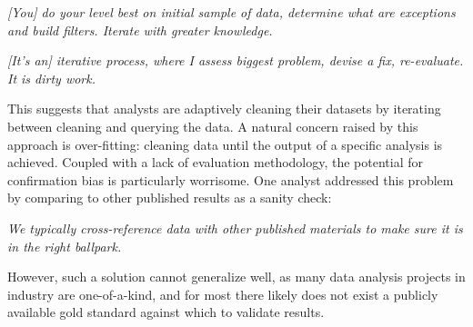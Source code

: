 \vspace{0.5em}
\emph{[You] do your level best on initial sample of data, determine what are exceptions and build filters. Iterate with greater knowledge.}

\vspace{0.7em}
\emph{[It's an] iterative process, where I assess biggest problem, devise a fix, re-evaluate. It is dirty work.}

\vspace{0.5em}

This suggests that analysts are adaptively cleaning their datasets by iterating between cleaning and querying the data.
A natural concern raised by this approach is over-fitting: cleaning data until the output of a specific analysis is achieved.
Coupled with a lack of evaluation methodology, the potential for confirmation bias is particularly worrisome.
One analyst addressed this problem by comparing to other published results as a sanity check:

\vspace{0.5em}
\emph{We typically cross-reference data with other published materials to make sure it is in the right ballpark.}
\vspace{0.5em}

However, such a solution cannot generalize well, as many data analysis projects in industry are one-of-a-kind, and for most there likely does not exist a publicly available gold standard against which to validate results.